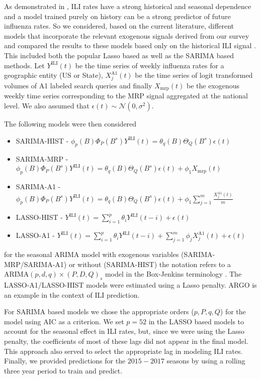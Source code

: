 \documentclass[fleqn,10pt]{wlscirep}
\begin{document}
As demonstrated in \cite{lazer_etal_2014}, ILI rates have a strong historical and seasonal dependence and a model trained purely on history can be a strong predictor of future influenza rates. So we considered, based on the current literature, different models that incorporate the relevant exogenous signals derived from our survey and compared the results to these models based only on the historical ILI signal \cite{yang_etal_2015}. This included both the popular Lasso based \cite{yang_etal_2015} as well as the SARIMA based methods. Let $Y^{\text{ILI}}(t)$ be the time series of weekly influenza rates for a geographic entity (US or State), $X_j^{\text{A1}}(t)$ be the time series of logit transformed volumes of A1 labeled search queries and finally $X_{\text{mrp}}(t)$ be the exogenous weekly time series corresponding to the MRP signal aggregated at the national level. We also assumed that $\epsilon(t) \sim \mathcal{N}(0,\sigma^2)$.

The following models were then considered
\begin{itemize}
\item SARIMA-HIST - $\phi_p(B)\Phi_P(B^s)Y^{\text{ILI}}(t) = \theta_q(B)\Theta_Q(B^s)\epsilon(t)$ \item SARIMA-MRP - $\phi_p(B)\Phi_P(B^s)Y^{\text{ILI}}(t) =  \theta_q(B)\Theta_Q(B^s)\epsilon(t) + \phi_1 X_{\text{mrp}}(t)$
\item SARIMA-A1 - $\phi_p(B)\Phi_P(B^s)Y^{\text{ILI}}(t) =  \theta_q(B)\Theta_Q(B^s)\epsilon(t) + \phi_1 \sum_{j=1}^m \frac{X_j^{\text{A1}}(t)}{m}$
\item LASSO-HIST - $Y^{\text{ILI}}(t) = \sum_{i=1}^p \theta_i Y^{\text{ILI}}(t-i)+\epsilon(t)$
\item LASSO-A1 - $Y^{\text{ILI}}(t) = \sum_{i=1}^p \theta_i Y^{\text{ILI}}(t-i) +  \sum_{j=1}^m \phi_j X_j^{\text{A1}}(t) + \epsilon(t)$
\end{itemize}
for the seasonal ARIMA model with exogenous variables (SARIMA-MRP/SARIMA-A1) or without (SARIMA-HIST) the notation refers to a ARIMA$(p,d,q)\times(P,D,Q)_s$ model in the Box-Jenkins terminology \cite{box_etal_2015}. The LASSO-A1/LASSO-HIST models were estimated using a Lasso penalty. ARGO \cite{yang_etal_2015inference, yang_etal_2015} is an example in the context of ILI prediction.

For SARIMA based models we chose the appropriate orders ($p,P,q,Q$) for the model using AIC as a criterion. We set $p=52$ in the LASSO based models to account for the seasonal effect in ILI rates, but, since we were using the Lasso penalty, the coefficients of most of these lags did not appear in the final model. This approach also served to select the appropriate lag in modeling ILI rates. Finally, we provided predictions for the $2015-2017$ seasons by using a rolling three year period to train and predict.
\end{document}

